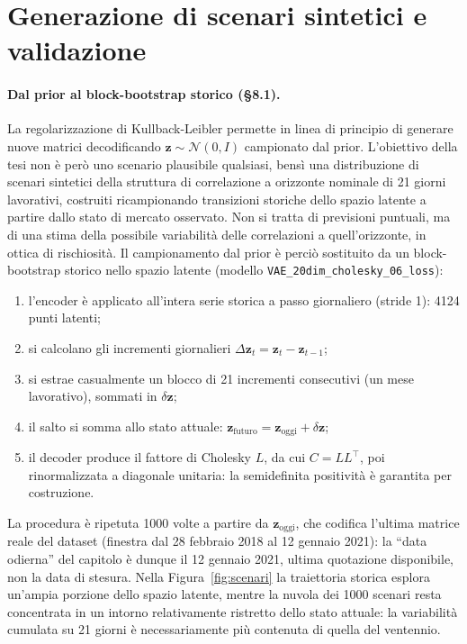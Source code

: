 \section{Generazione di scenari sintetici e validazione}

\paragraph{Dal prior al block-bootstrap storico (\S8.1).}
La regolarizzazione di Kullback-Leibler permette in linea di principio di generare nuove matrici decodificando $\mathbf{z} \sim \mathcal{N}(0, I)$ campionato dal prior. L'obiettivo della tesi non è però uno scenario plausibile qualsiasi, bensì una distribuzione di scenari sintetici della struttura di correlazione a orizzonte nominale di 21 giorni lavorativi, costruiti ricampionando transizioni storiche dello spazio latente a partire dallo stato di mercato osservato. Non si tratta di previsioni puntuali, ma di una stima della possibile variabilità delle correlazioni a quell'orizzonte, in ottica di rischiosità. Il campionamento dal prior è perciò sostituito da un block-bootstrap storico nello spazio latente (modello \texttt{VAE\_20dim\_cholesky\_06\_loss}):
\begin{enumerate}
\item l'encoder è applicato all'intera serie storica a passo giornaliero (stride 1): 4124 punti latenti;
\item si calcolano gli incrementi giornalieri $\Delta \mathbf{z}_t = \mathbf{z}_t - \mathbf{z}_{t-1}$;
\item si estrae casualmente un blocco di 21 incrementi consecutivi (un mese lavorativo), sommati in $\delta \mathbf{z}$;
\item il salto si somma allo stato attuale: $\mathbf{z}_{\mathrm{futuro}} = \mathbf{z}_{\mathrm{oggi}} + \delta \mathbf{z}$;
\item il decoder produce il fattore di Cholesky $L$, da cui $C = L L^{\top}$, poi rinormalizzata a diagonale unitaria: la semidefinita positività è garantita per costruzione.
\end{enumerate}
La procedura è ripetuta 1000 volte a partire da $\mathbf{z}_{\mathrm{oggi}}$, che codifica l'ultima matrice reale del dataset (finestra dal 28 febbraio 2018 al 12 gennaio 2021): la ``data odierna'' del capitolo è dunque il 12 gennaio 2021, ultima quotazione disponibile, non la data di stesura. Nella Figura~\ref{fig:scenari} la traiettoria storica esplora un'ampia porzione dello spazio latente, mentre la nuvola dei 1000 scenari resta concentrata in un intorno relativamente ristretto dello stato attuale: la variabilità cumulata su 21 giorni è necessariamente più contenuta di quella del ventennio.

